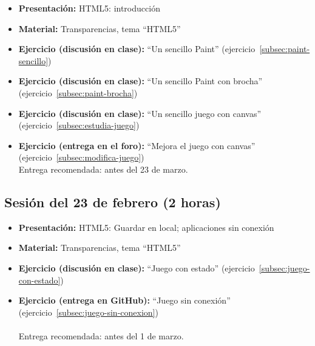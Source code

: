 \documentclass[a4paper,12pt]{report}
\begin{document}
\begin{itemize}
\item \textbf{Presentación:} HTML5: introducción
\item \textbf{Material:} Transparencias, tema ``HTML5''


\item \textbf{Ejercicio (discusión en clase):} ``Un sencillo Paint'' (ejercicio~\ref{subsec:paint-sencillo})
\item \textbf{Ejercicio (discusión en clase):} ``Un sencillo Paint con brocha'' (ejercicio~\ref{subsec:paint-brocha}) \\
 \item \textbf{Ejercicio (discusión en clase):} ``Un sencillo juego con canvas'' (ejercicio~\ref{subsec:estudia-juego})
 \item \textbf{Ejercicio (entrega en el foro):} ``Mejora el juego con canvas'' (ejercicio~\ref{subsec:modifica-juego}) \\
Entrega recomendada: antes del 23 de marzo.
\end{itemize}


\subsection{Sesión del 23 de febrero (2 horas)}

\begin{itemize}
 \item \textbf{Presentación:} HTML5: Guardar en local; aplicaciones sin conexión
 \item \textbf{Material:} Transparencias, tema ``HTML5''
 \item \textbf{Ejercicio (discusión en clase):} ``Juego con estado'' (ejercicio~\ref{subsec:juego-con-estado})
 \item \textbf{Ejercicio (entrega en GitHub):} ``Juego sin conexión'' (ejercicio~\ref{subsec:juego-sin-conexion}) \\
  \\
Entrega recomendada: antes del 1 de marzo.
 \end{itemize}
\end{document}
